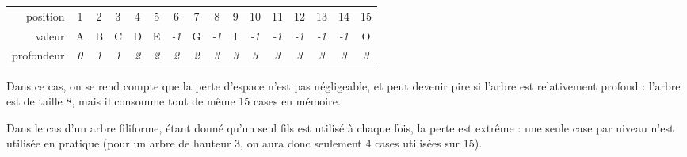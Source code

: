 \documentclass[11pt,a4paper]{article}
\begin{document}
\begin{center}
\begin{tabular}{ r c cc cccc cccccccc }
position   & 1 & 2 & 3 & 4 & 5 & 6 & 7 & 8 & 9 & 10 & 11 & 12 & 13 & 14 & 15 \\
\cline{2-16}
valeur     & \multicolumn{1}{|c|}{A} &
\multicolumn{1}{c|}{B} & \multicolumn{1}{c|}{C} &
\multicolumn{1}{c|}{D} & \multicolumn{1}{c|}{E} &
  \multicolumn{1}{c|}{\footnotesize \textit{-1}} & \multicolumn{1}{c|}{G} &
\multicolumn{1}{c|}{\footnotesize \textit{-1}} & \multicolumn{1}{c|}{I} & \multicolumn{1}{c|}{\footnotesize \textit{-1}} & \multicolumn{1}{c|}{\footnotesize \textit{-1}} &
  \multicolumn{1}{c|}{\footnotesize \textit{-1}} & \multicolumn{1}{c|}{\footnotesize \textit{-1}} & \multicolumn{1}{c|}{\footnotesize \textit{-1}} & \multicolumn{1}{c|}{O} \\
\cline{2-16}
profondeur & \textit{0} &
\textit{1} & \textit{1} &
\textit{2} & \textit{2} &
  \textit{2} & \textit{2} &
\textit{3} & \textit{3} & \textit{3} & \textit{3} &
  \textit{3} & \textit{3} & \textit{3} & \textit{3} \\
\end{tabular}
\end{center}

\medskip

Dans ce cas, on se rend compte que la perte d'espace n'est pas négligeable, et peut devenir pire si l'arbre est relativement profond : l'arbre est de taille 8, mais il consomme tout de même 15 cases en mémoire.

\medskip

Dans le cas d'un arbre filiforme, étant donné qu'un seul fils est utilisé à chaque fois, la perte est extrême : une seule case par niveau n'est utilisée en pratique (pour un arbre de hauteur 3, on aura donc seulement 4 cases utilisées sur 15).

\medskip
\end{document}
